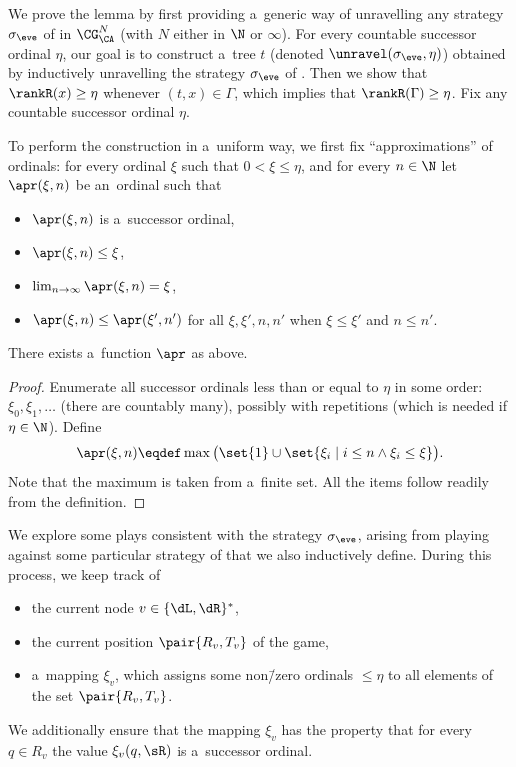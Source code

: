 \documentclass{lmcs}
\numberwithin{equation}{section}
\numberwithin{figure}{section}
\begin{document}
\lemSoundness*
\noindent %
We prove the lemma by first providing a~generic way of unravelling any strategy $\sigma_\eve$ of \eve in $\CG^N_\CA$ (with $N$ either in $\N$ or $\infty$).
For every countable successor ordinal $\eta$, our goal is to construct a~tree $t$ (denoted $\unravel(\sigma_\eve, \eta)$) obtained by inductively unravelling the strategy $\sigma_\eve$ of \eve.
Then we show that $\rankR(x)\geq\eta$ whenever $(t,x)\in\Gamma$, which implies that $\rankR(\Gamma)\geq \eta$.
Fix any countable successor ordinal $\eta$.

To perform the construction in a~uniform way, we first fix ``approximations'' of ordinals:
for every ordinal $\xi$ such that $0<\xi\leq\eta$, and for every $n\in\N$ let $\apr(\xi,n)$ be an~ordinal such that
\begin{itemize}
\item	$\apr(\xi,n)$ is a~successor ordinal,
\item	$\apr(\xi,n)\leq\xi$,
\item	$\lim_{n\to\infty}\apr(\xi,n)=\xi$,
\item	$\apr(\xi,n)\leq\apr(\xi',n')$ for all $\xi,\xi',n, n'$ when $\xi\leq\xi'$ and $n\leq n'$.
\end{itemize}

\begin{lem}
	There exists a~function $\apr$ as above.
\end{lem}

\begin{proof}
	Enumerate all successor ordinals less than or equal to $\eta$ in some order: $\xi_0,\xi_1,\dots$ (there are countably many),
	possibly with repetitions (which is needed if $\eta\in\N$).
	Define
	\[\apr(\xi,n)\eqdef\max\big(\set{1}\cup\set{\xi_i\mid i\leq n\land\xi_i\leq\xi}\big).\]
	Note that the maximum is taken from a~finite set.
	All the items follow readily from the definition.
\end{proof}

We explore some plays consistent with the strategy $\sigma_\eve$, arising from playing against some particular strategy of \adam that we also inductively define.
During this process, we keep track of
\begin{itemize}
\item the current node $v\in\{\dL,\dR\}^\ast$,
\item the current position $\pair{R_v, T_v}$ of the game,
\item a~mapping $\xi_v$, which assigns some non\=/zero ordinals $\leq \eta$ to all elements of the set $\pair{R_v,T_v}$.
\end{itemize}
We additionally ensure that the mapping $\xi_v$ has the property that for every $q\in R_v$ the value $\xi_v(q,\sR)$ is a~successor ordinal.
\end{document}

